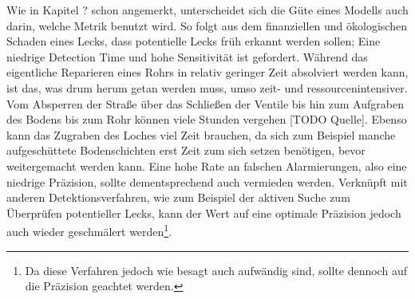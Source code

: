 Wie in Kapitel ? schon angemerkt, unterscheidet sich die Güte eines Modells auch darin, welche Metrik
 benutzt wird. So folgt aus dem finanziellen und ökologischen Schaden eines Lecks, dass potentielle Lecks
 früh erkannt werden sollen; Eine niedrige Detection Time und hohe Sensitivität ist gefordert.
 Während das eigentliche Reparieren eines Rohrs in relativ geringer Zeit absolviert werden kann, ist das, was
 drum herum getan werden muss, umso zeit- und ressourcenintensiver. Vom Absperren der Straße über das Schließen
 der Ventile bis hin zum Aufgraben des Bodens bis zum Rohr können viele Stunden vergehen [TODO Quelle]. Ebenso kann
 das Zugraben des Loches viel Zeit brauchen, da sich zum Beispiel manche aufgeschüttete Bodenschichten erst Zeit
 zum sich setzen benötigen, bevor weitergemacht werden kann. Eine hohe Rate an falschen Alarmierungen, also eine
 niedrige Präzision, sollte dementsprechend auch vermieden werden. Verknüpft mit anderen Detektionsverfahren,
 wie zum Beispiel der aktiven Suche zum Überprüfen potentieller Lecks, kann der Wert auf eine optimale Präzision
 jedoch auch wieder geschmälert werden\footnote{Da diese Verfahren jedoch wie besagt auch aufwändig sind, sollte
 dennoch auf die Präzision geachtet werden.}.

